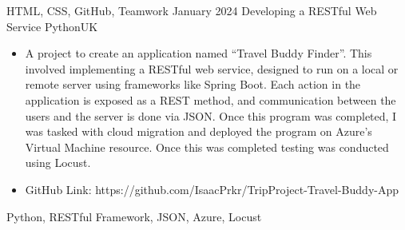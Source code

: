 \begin{experiences}
{\begin{itemize}
    \end{itemize}
  }
  {HTML, CSS, GitHub, Teamwork}
  \emptySeparator
  \experience
  {January 2024}   {Developing a RESTful Web Service }{Python}{UK}
  {} {
    \begin{itemize}
      \item A project to create an application named “Travel Buddy Finder”. This involved implementing a RESTful web service, designed to run on a local or remote server using frameworks like Spring Boot. Each action in the application is exposed as a REST method, and communication between the users and the server is done via JSON. Once this program was completed, I was tasked with cloud migration and deployed the program on Azure’s Virtual Machine resource. Once this was completed testing was conducted using Locust.
      \item GitHub Link: https://github.com/IsaacPrkr/TripProject-Travel-Buddy-App
    \end{itemize}
  }
  {Python, RESTful Framework, JSON, Azure, Locust}
  \emptySeparator
\end{experiences}
